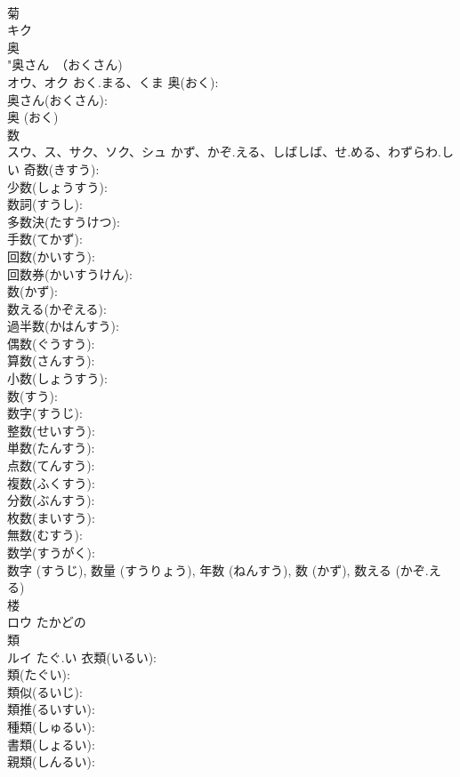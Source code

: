 \documentclass[8pt]{extreport}
\begin{document}
\begin{CJK}{UTF8}{min}
\\	菊			
\\	キク			
\\	奥			
\\	"奥さん　（おくさん) 
\\	オウ、オク	おく.まる、くま	奥(おく): 
\\	奥さん(おくさん): 
\\	奥 (おく)
\\	数			
\\	スウ、ス、サク、ソク、シュ	かず、かぞ.える、しばしば、せ.める、わずらわ.しい	奇数(きすう): 
\\	少数(しょうすう): 
\\	数詞(すうし): 
\\	多数決(たすうけつ): 
\\	手数(てかず): 
\\	回数(かいすう): 
\\	回数券(かいすうけん): 
\\	数(かず): 
\\	数える(かぞえる): 
\\	過半数(かはんすう): 
\\	偶数(ぐうすう): 
\\	算数(さんすう): 
\\	小数(しょうすう): 
\\	数(すう): 
\\	数字(すうじ): 
\\	整数(せいすう): 
\\	単数(たんすう): 
\\	点数(てんすう): 
\\	複数(ふくすう): 
\\	分数(ぶんすう): 
\\	枚数(まいすう): 
\\	無数(むすう): 
\\	数学(すうがく): 
\\	数字 (すうじ), 数量 (すうりょう), 年数 (ねんすう), 数 (かず), 数える (かぞ.える)
\\	楼			
\\	ロウ	たかどの		
\\	類			
\\	ルイ	たぐ.い	衣類(いるい): 
\\	類(たぐい): 
\\	類似(るいじ): 
\\	類推(るいすい): 
\\	種類(しゅるい): 
\\	書類(しょるい): 
\\	親類(しんるい): 

\end{CJK}
\end{document}
